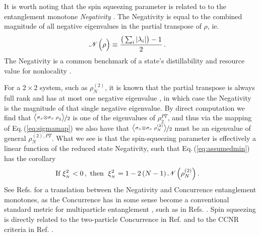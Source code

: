 \documentclass[
  12pt          %
  ,letterpaper  %
  ,center       %
  ,noupper      %
  ,english,fleqn]{uconnthesis}
\newcommand{\ceq}[1]{Eq.\,(\ref{#1})}
\begin{document}
It is worth noting that the spin squeezing parameter is related to to the entanglement monotone {\em Negativity} \cite{OneNegativeEigenvalue,NegativityIntro,multireview,PlenioEntanglementMeasures}. The Negativity is equal to the combined magnitude of all negative eigenvalues in the partial transpose of $\rho$, ie.
\begin{align}\label{eq:negativity}
\operatorname{\mathscr{N}}{\hspace{-0.25ex}\Big(\rho\Big)} &\equiv \frac{\big(\sum_{i}{\left|\lambda_i\right|}\big)-1}{2}\,.
\end{align}
The Negativity is a common benchmark of a state's distillability and resource value for nonlocality \cite{GivenQB.NQubit,GivenQB.Cabello}. 

For a $2\times 2$ system, such as $\rho_N^{(2)}$, it is known that the partial transpose is always full rank and has at most one negative eigenvalue \cite{OneNegativeEigenvalue}, in which case the Negativity is the magnitude of that single negative eigenvalue. By direct computation we find that $\nicefrac{\Braket{\sigma_x \otimes \sigma_x \;\rho_2^{\vphantom{(2)}}}}{2}$ is one of the eigenvalues of $\rho_2^{PT}$, and thus via the mapping of \ceq{eq:sigmamap} we also have that $\nicefrac{\Braket{\sigma_x \otimes \sigma_x \;\rho_N^{(2)}}}{2}$ must be an eigenvalue of general ${\rho_N^{(2),PT}}$. What we see is that the spin-squeezing parameter is effectively a linear function of the reduced state Negativity, such that \ceq{eq:assumedmin} has the corollary 
\begin{align}\label{eq:negrelation}
\text{If }\xi^2_{_N}<0\,,\text{ then }\;\xi^2_{_N} & = 1-2\left(N-1\right)\operatorname{{\mathscr{N}}}{\hspace{-0.25ex}\Big(\rho_N^{(2)}\Big)}\,.
\end{align}
See Refs. \cite{OneNegativeEigenvalue,ConvVsNeg} for a translation between the Negativity and Concurrence entanglement monotones, as the Concurrence has in some sense become a conventional standard metric for multiparticle entanglement \cite{MultipartiteConc}, such as in Refs. \cite{SpinEntanglementMorrison,ConcVsGeom}. Spin squeezing is directly related to the two-particle Concurrence in Ref. \citep[Eq. (5)]{RamseySpinSqueezing} and to the CCNR criteria in Ref. \citep[Obs. 2]{SymmetricEquivalents}.
\end{document}
